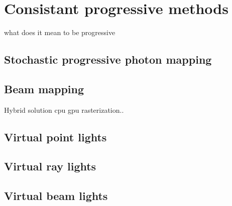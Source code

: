\chapter{Consistant progressive methods}
what does it mean to be progressive
\section{Stochastic progressive photon mapping}

\section{Beam mapping}
Hybrid solution cpu gpu rasterization..
\section{Virtual point lights}

\section{Virtual ray lights}

\section{Virtual beam lights}





